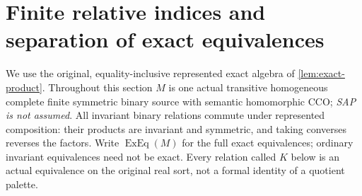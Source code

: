 \section{Finite relative indices and separation of exact equivalences}
\label{sec:foundations-relative-parity}

We use the original, equality-inclusive represented exact algebra of
\cref{lem:exact-product}. Throughout this section $M$ is one actual
transitive homogeneous complete finite symmetric binary source with
semantic homomorphic CCO; \emph{SAP is not assumed}. All invariant binary
relations commute under represented composition: their products are
invariant and symmetric, and taking converses reverses the factors.
Write $\operatorname{ExEq}(M)$ for the full exact equivalences; ordinary
invariant equivalences need not be exact. Every relation called $K$ below
is an actual equivalence on the original real sort, not a formal identity
of a quotient palette.

